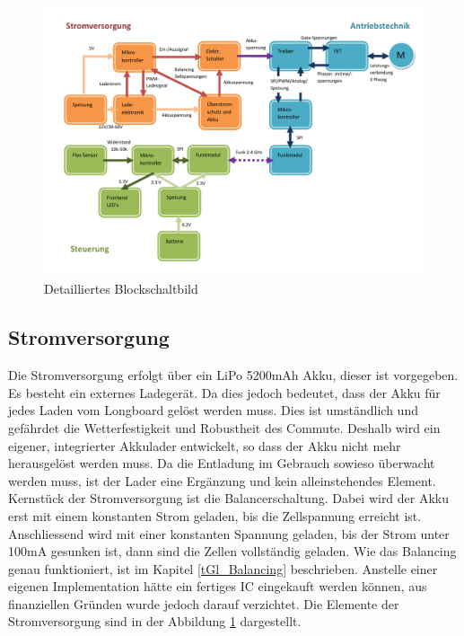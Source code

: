 \begin{figure}[h]
	\centering
	\includegraphics[width=\linewidth]{images/Grobkonzept_Blockschaltbild_detailliert}
	\caption[Detailliertes Blockschaltbild]{Detailliertes Blockschaltbild}
	\label{fig:grobkonzeptblockschaltbilddetailliert}
\end{figure}

\subsection*{Stromversorgung}
Die Stromversorgung erfolgt über ein LiPo 5200mAh Akku, dieser ist vorgegeben. Es besteht ein externes Ladegerät. Da dies jedoch bedeutet, dass der Akku für jedes Laden vom Longboard gelöst werden muss. Dies ist umständlich und gefährdet die Wetterfestigkeit und Robustheit des Commute. Deshalb wird ein eigener, integrierter Akkulader entwickelt, so dass der Akku nicht mehr herausgelöst werden muss. Da die Entladung im Gebrauch sowieso überwacht werden muss, ist der Lader eine Ergänzung und kein alleinstehendes Element. Kernstück der Stromversorgung ist die Balancerschaltung. Dabei wird der Akku erst mit einem konstanten Strom geladen, bis die Zellspannung erreicht ist. Anschliessend wird mit einer konstanten Spannung geladen, bis der Strom unter 100mA gesunken ist, dann sind die Zellen vollständig geladen. Wie das Balancing genau funktioniert, ist im Kapitel \ref{tGl_Balancing} beschrieben. Anstelle einer eigenen Implementation hätte ein fertiges IC eingekauft werden können, aus finanziellen Gründen wurde jedoch darauf verzichtet. Die Elemente der Stromversorgung sind in der Abbildung \ref{fig:grobkonzeptblockschaltbilddetailliert} dargestellt.



